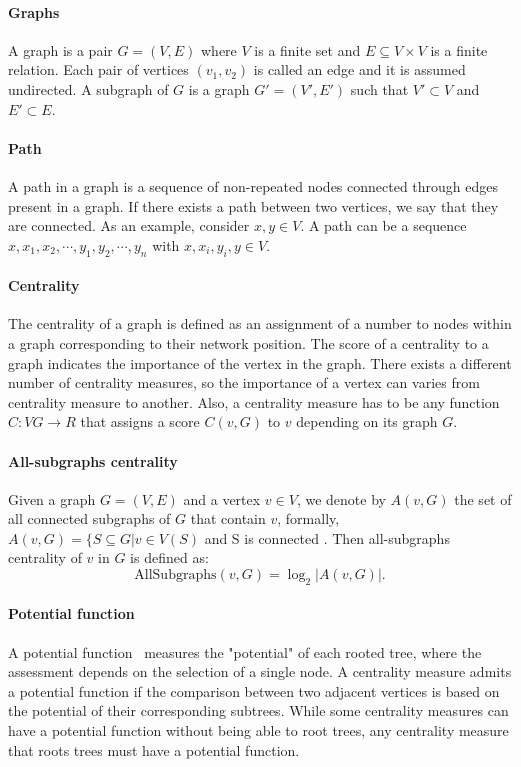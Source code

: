 

\paragraph{Graphs} A graph is a pair $G = (V, E)$ where $V$ is a finite set and $E \subseteq V\times V$ is a finite relation. Each pair of vertices $(v_{1},v_{2})$ is called an edge and it is assumed undirected. A subgraph of $G$ is a graph $G'=(V', E')$ such that $V' \subset V$ and $E' \subset E$.

\paragraph{Path} A path in a graph is a sequence of non-repeated nodes connected through edges present in a graph. If there exists a path between two vertices, we say that they are connected. As an example, consider $x,y \in V$. A path can be a sequence $x,x_{1},x_{2},\cdots,y_{1},y_{2},\cdots,y_{n}$ with $x,x_{i},y_{i},y \in V$.


\paragraph{Centrality} The centrality of a graph is defined as an assignment of a number to nodes within a graph corresponding to their network position. The score of a centrality to a graph indicates the importance of the vertex in the graph. There exists a different number of centrality measures, so the importance of a vertex can varies from centrality measure to another. Also, a centrality measure has to be any function $C : VG \rightarrow R$ that assigns a score $C(v, G)$ to $v$ depending on its graph $G$. 

\paragraph{All-subgraphs centrality} Given a graph $G = (V, E)$ and a vertex $v \in V$, we denote by $A(v, G)$ the set of all connected subgraphs of $G$ that contain $v$, formally, $A(v, G) = \{S \subseteq G | v \in V (S)$ and S is connected \cite{RiverosS20}. Then all-subgraphs centrality of $v$ in $G$ is defined
as: 
$$
\text{AllSubgraphs}(v, G) = \log_{2}{|A(v, G)|}.
$$

\paragraph{Potential function} 
A potential function~\cite{RiverosSS23} measures the "potential" of each rooted tree, where the assessment depends on the selection of a single node. A centrality measure admits a potential function if the comparison between two adjacent vertices is based on the potential of their corresponding subtrees. While some centrality measures can have a potential function without being able to root trees, any centrality measure that roots trees must have a potential function.

